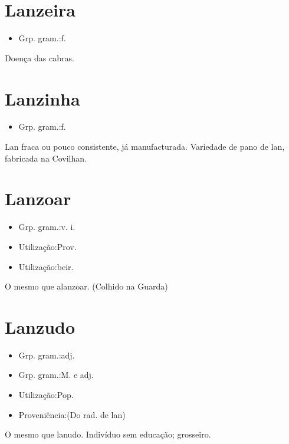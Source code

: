 \section{Lanzeira}
\begin{itemize}
\item {Grp. gram.:f.}
\end{itemize}
Doença das cabras.
\section{Lanzinha}
\begin{itemize}
\item {Grp. gram.:f.}
\end{itemize}
Lan fraca ou pouco consistente, já manufacturada.
Variedade de pano de lan, fabricada na Covilhan.
\section{Lanzoar}
\begin{itemize}
\item {Grp. gram.:v. i.}
\end{itemize}
\begin{itemize}
\item {Utilização:Prov.}
\end{itemize}
\begin{itemize}
\item {Utilização:beir.}
\end{itemize}
O mesmo que \textunderscore alanzoar\textunderscore . (Colhido na Guarda)
\section{Lanzudo}
\begin{itemize}
\item {Grp. gram.:adj.}
\end{itemize}
\begin{itemize}
\item {Grp. gram.:M.  e  adj.}
\end{itemize}
\begin{itemize}
\item {Utilização:Pop.}
\end{itemize}
\begin{itemize}
\item {Proveniência:(Do rad. de \textunderscore lan\textunderscore )}
\end{itemize}
O mesmo que \textunderscore lanudo\textunderscore .
Indivíduo sem educação; grosseiro.
